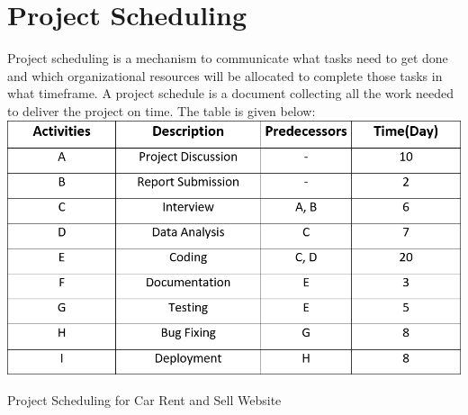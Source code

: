 \documentclass[10pt,twosides]{report}
\begin{document}
\noindent 

\begin{table}
\section{   Project Scheduling}
Project scheduling is a mechanism to communicate what tasks need to get done and which organizational resources will be allocated to complete those tasks in what timeframe. A project schedule is a document collecting all the work needed to deliver the project on time. The table is given below:\\


\noindent \includegraphics*[width=5.3in, height=3 in]{figures/PS}

\caption{Project Scheduling for Car Rent and Sell Website}

\end{table}
\end{document}
